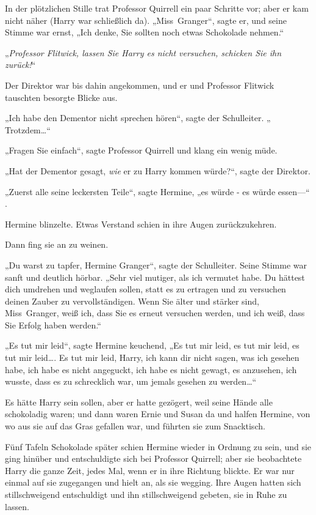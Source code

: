 {In der plötzlichen Stille trat Professor Quirrell ein paar Schritte vor; aber er kam nicht näher (Harry war schließlich da). „Miss~Granger“, sagte er, und seine Stimme war ernst, „Ich denke, Sie sollten noch etwas Schokolade nehmen.“

„\emph{Professor Flitwick, lassen Sie Harry es nicht versuchen, schicken Sie ihn zurück!}“

Der Direktor war bis dahin angekommen, und er und Professor Flitwick tauschten besorgte Blicke aus.

„Ich habe den Dementor nicht sprechen hören“, sagte der Schulleiter. „ Trotzdem…“

„Fragen Sie einfach“, sagte Professor Quirrell und klang ein wenig müde.

„Hat der Dementor gesagt, \emph{wie} er zu Harry kommen würde?“, sagte der Direktor.

„Zuerst alle seine leckersten Teile“, sagte Hermine, „es würde - es würde essen—“ .

Hermine blinzelte. Etwas Verstand schien in ihre Augen zurückzukehren.

Dann fing sie an zu weinen.

„Du warst zu tapfer, Hermine Granger“, sagte der Schulleiter. Seine Stimme war sanft und deutlich hörbar. „Sehr viel mutiger, als ich vermutet habe. Du hättest dich umdrehen und weglaufen sollen, statt es zu ertragen und zu versuchen deinen Zauber zu vervollständigen. Wenn Sie älter und stärker sind, Miss~Granger, weiß ich, dass Sie es erneut versuchen werden, und ich weiß, dass Sie Erfolg haben werden.“

„Es tut mir leid“, sagte Hermine keuchend, „Es tut mir leid, es tut mir leid, es tut mir leid…. Es tut mir leid, Harry, ich kann dir nicht sagen, was ich gesehen habe, ich habe es nicht angeguckt, ich habe es nicht gewagt, es anzusehen, ich wusste, dass es zu schrecklich war, um jemals gesehen zu werden…“

Es hätte Harry sein sollen, aber er hatte gezögert, weil seine Hände alle schokoladig waren; und dann waren Ernie und Susan da und halfen Hermine, von wo aus sie auf das Gras gefallen war, und führten sie zum Snacktisch.

Fünf Tafeln Schokolade später schien Hermine wieder in Ordnung zu sein, und sie ging hinüber und entschuldigte sich bei Professor Quirrell; aber sie beobachtete Harry die ganze Zeit, jedes Mal, wenn er in ihre Richtung blickte. Er war nur einmal auf sie zugegangen und hielt an, als sie wegging. Ihre Augen hatten sich stillschweigend entschuldigt und ihn stillschweigend gebeten, sie in Ruhe zu lassen.

}
